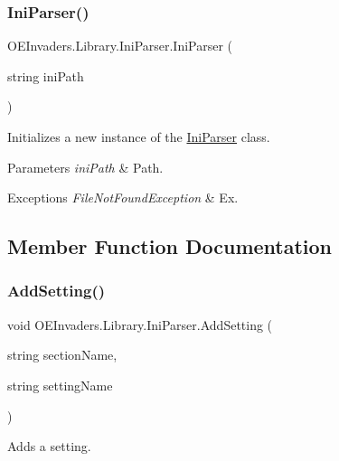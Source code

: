 \subsubsection{\texorpdfstring{IniParser()}{IniParser()}}
{\footnotesize\ttfamily O\+E\+Invaders.\+Library.\+Ini\+Parser.\+Ini\+Parser (\begin{DoxyParamCaption}\item[{string}]{ini\+Path }\end{DoxyParamCaption})}



Initializes a new instance of the \mbox{\hyperlink{class_o_e_invaders_1_1_library_1_1_ini_parser}{Ini\+Parser}} class. 


\begin{DoxyParams}{Parameters}
{\em ini\+Path} & Path.\\
\hline
\end{DoxyParams}

\begin{DoxyExceptions}{Exceptions}
{\em File\+Not\+Found\+Exception} & Ex.\\
\hline
\end{DoxyExceptions}


\subsection{Member Function Documentation}
\mbox{\label{class_o_e_invaders_1_1_library_1_1_ini_parser_a65d6a0da20cd1d220a72584d79e7ad33}} 
\subsubsection{\texorpdfstring{AddSetting()}{AddSetting()}\hspace{0.1cm}{\footnotesize\ttfamily [1/2]}}
{\footnotesize\ttfamily void O\+E\+Invaders.\+Library.\+Ini\+Parser.\+Add\+Setting (\begin{DoxyParamCaption}\item[{string}]{section\+Name,  }\item[{string}]{setting\+Name }\end{DoxyParamCaption})}



Adds a setting. 


